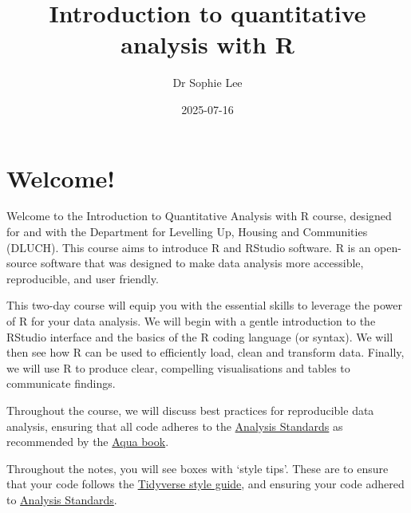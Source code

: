 \documentclass[
  letterpaper,
  DIV=11,
  numbers=noendperiod]{scrreprt}
\title{Introduction to quantitative analysis with R}
\author{Dr Sophie Lee}
\date{2025-07-16}
\renewcommand*\contentsname{Table of contents}
\newcommand\contentsname{Table of contents}
\begin{document}
\maketitle

\renewcommand*\contentsname{Table of contents}
{
\hypersetup{linkcolor=}
\setcounter{tocdepth}{2}
\tableofcontents
}

\chapter*{Welcome!}\label{welcome}


Welcome to the Introduction to Quantitative Analysis with R course,
designed for and with the Department for Levelling Up, Housing and
Communities (DLUCH). This course aims to introduce R and RStudio
software. R is an open-source software that was designed to make data
analysis more accessible, reproducible, and user friendly.

This two-day course will equip you with the essential skills to leverage
the power of R for your data analysis. We will begin with a gentle
introduction to the RStudio interface and the basics of the R coding
language (or syntax). We will then see how R can be used to efficiently
load, clean and transform data. Finally, we will use R to produce clear,
compelling visualisations and tables to communicate findings.

Throughout the course, we will discuss best practices for reproducible
data analysis, ensuring that all code adheres to the
\href{https://best-practice-and-impact.github.io/qa-of-code-guidance/intro.html}{Analysis
Standards} as recommended by the
\href{https://www.gov.uk/government/publications/the-aqua-book-guidance-on-producing-quality-analysis-for-government}{Aqua
book}.

\begin{tcolorbox}[enhanced jigsaw, bottomrule=.15mm, left=2mm, leftrule=.75mm, bottomtitle=1mm, coltitle=black, colbacktitle=quarto-callout-tip-color!10!white, toptitle=1mm, arc=.35mm, breakable, title=\textcolor{quarto-callout-tip-color}{\faLightbulb}\hspace{0.5em}{Style tip}, rightrule=.15mm, toprule=.15mm, opacityback=0, opacitybacktitle=0.6, titlerule=0mm, colback=white, colframe=quarto-callout-tip-color-frame]

Throughout the notes, you will see boxes with `style tips'. These are to
ensure that your code follows the
\href{https://style.tidyverse.org/index.html}{Tidyverse style guide},
and ensuring your code adhered to
\href{https://best-practice-and-impact.github.io/qa-of-code-guidance/intro.html}{Analysis
Standards}.

\end{tcolorbox}
\end{document}
